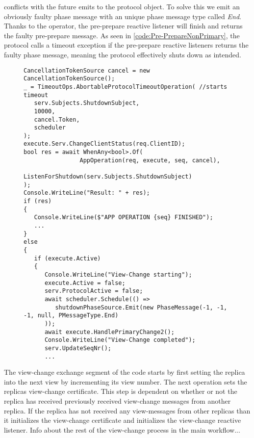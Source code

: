 conflicts with the future emits to the protocol  object. To solve this we emit an obviously faulty phase message with an unique phase message type called \emph{End}. Thanks to the  operator, the pre-prepare reactive listener will finish and returns the faulty pre-prepare message. As seen in \autoref{code:Pre-PrepareNonPrimary}, the protocol calls a timeout exception if the pre-prepare reactive listeners returns the faulty phase message, meaning the protocol effectively shuts down as intended.   
\begin{figure}[H]
	\centering
	\begin{lstlisting}[label = code:timeout, caption=Handling timeout for the normal protocol workflow and initiate View-Change, captionpos = b, basicstyle=\scriptsize]
CancellationTokenSource cancel = new CancellationTokenSource();
_ = TimeoutOps.AbortableProtocolTimeoutOperation( //starts timeout
   serv.Subjects.ShutdownSubject,
   10000,
   cancel.Token,
   scheduler
);
execute.Serv.ChangeClientStatus(req.ClientID);
bool res = await WhenAny<bool>.Of(
                AppOperation(req, execute, seq, cancel),
                ListenForShutdown(serv.Subjects.ShutdownSubject)
);
Console.WriteLine("Result: " + res);
if (res)
{
   Console.WriteLine($"APP OPERATION {seq} FINISHED");
   ...
}
else
{
   if (execute.Active)
   {
      Console.WriteLine("View-Change starting");
      execute.Active = false;
      serv.ProtocolActive = false;
      await scheduler.Schedule(() =>
         shutdownPhaseSource.Emit(new PhaseMessage(-1, -1, -1, null, PMessageType.End)
      ));
      await execute.HandlePrimaryChange2(); 
      Console.WriteLine("View-Change completed");
      serv.UpdateSeqNr();
      ...
    \end{lstlisting}
\end{figure} 
\fi
\iffalse
The view-change exchange segment of the code starts by first setting the replica into the next view by incrementing its view number. The next operation sets the replicas view-change certificate. This step is dependent on whether or not the replica has received previously received view-change messages from another replica. If the replica has not received any view-messages from other replicas than it initializes the view-change certificate and initializes the view-change reactive listener. Info about the rest of the view-change process in the main workflow...

